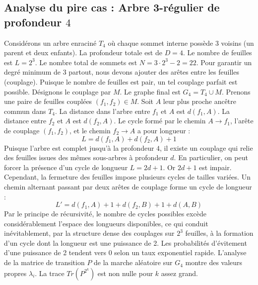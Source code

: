 \documentclass[11pt,a4paper]{article}
\begin{document}
\subsection{Analyse du pire cas : Arbre 3-régulier de profondeur $4$}
Considérons un arbre enraciné $T_{4}$ où chaque sommet interne possède 3 voisins (un parent et deux enfants).
La profondeur totale est de $D = 4$.
Le nombre de feuilles est $L = 2^{3}$.
Le nombre total de sommets est $N = 3 \cdot 2^{3} - 2 = 22$.
Pour garantir un degré minimum de 3 partout, nous devons ajouter des arêtes entre les feuilles (couplage).
Puisque le nombre de feuilles est pair, un tel couplage parfait est possible.
Désignons le couplage par $M$. Le graphe final est $G_{4} = T_{4} \cup M$.
Prenons une paire de feuilles couplées $(f_1, f_2) \in M$.
Soit $A$ leur plus proche ancêtre commun dans $T_{4}$.
La distance dans l'arbre entre $f_1$ et $A$ est $d(f_1, A)$.
La distance entre $f_2$ et $A$ est $d(f_2, A)$.
Le cycle formé par le chemin $A \to f_1$, l'arête de couplage $(f_1, f_2)$, et le chemin $f_2 \to A$ a pour longueur :
$$ L = d(f_1, A) + d(f_2, A) + 1 $$
Puisque l'arbre est complet jusqu'à la profondeur $4$, il existe un couplage qui relie des feuilles issues des mêmes sous-arbres à profondeur $d$.
En particulier, on peut forcer la présence d'un cycle de longueur $L = 2d + 1$. Or $2d+1$ est impair.
Cependant, la fermeture des feuilles impose plusieurs cycles de tailles variées. Un chemin alternant passant par deux arêtes de couplage forme un cycle de longueur :
$$ L' = d(f_1, A) + 1 + d(f_2, B) + 1 + d(A, B) $$
Par le principe de récursivité, le nombre de cycles possibles excède considérablement l'espace des longueurs disponibles, ce qui conduit inévitablement, par la structure dense des couplages sur $2^{3}$ feuilles, à la formation d'un cycle dont la longueur est une puissance de 2. Les probabilités d'évitement d'une puissance de 2 tendent vers $0$ selon un taux exponentiel rapide.
L'analyse de la matrice de transition $P$ de la marche aléatoire sur $G_{4}$ montre des valeurs propres $\lambda_i$. La trace $Tr(P^{2^k})$ est non nulle pour $k$ assez grand.
\end{document}
